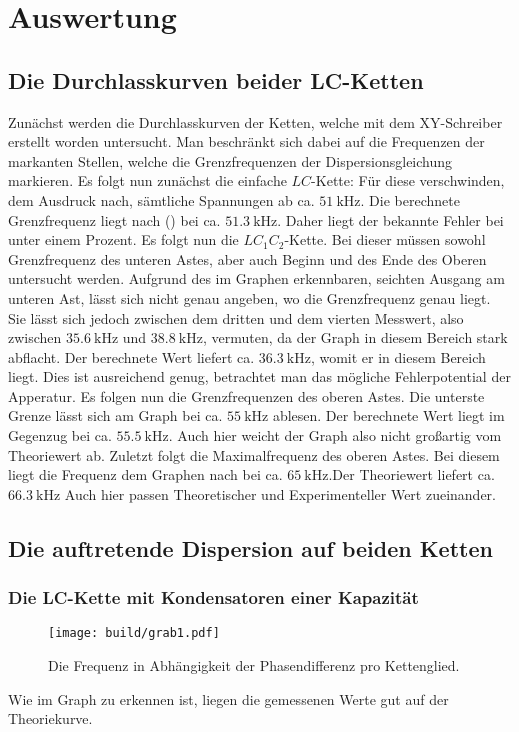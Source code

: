 
\section{Auswertung}
\label{sec:Auswertung}
\subsection{Die Durchlasskurven beider LC-Ketten}
Zunächst werden die Durchlasskurven der Ketten, welche mit dem XY-Schreiber
 erstellt worden untersucht. Man beschränkt sich dabei auf die Frequenzen der
  markanten Stellen, welche die Grenzfrequenzen der Dispersionsgleichung
	 markieren. Es folgt nun zunächst die einfache $LC$-Kette:
	 Für diese verschwinden, dem Ausdruck nach, sämtliche Spannungen ab ca.
	  $\SI{51}{\kilo\hertz}$. Die berechnete Grenzfrequenz liegt nach () bei
		 ca. $\SI{51,3}{\kilo\hertz}$. Daher liegt der bekannte Fehler bei
		  unter einem Prozent. Es folgt nun die $LC_1C_2$-Kette. Bei dieser müssen
			 sowohl Grenzfrequenz des unteren Astes, aber auch Beginn und des Ende des
			  Oberen untersucht werden. Aufgrund des im Graphen erkennbaren, seichten
				Ausgang am unteren Ast, lässt sich nicht genau angeben, wo die
				 Grenzfrequenz genau liegt. Sie lässt sich jedoch zwischen dem dritten
				  und dem vierten Messwert, also zwischen $\SI{35,6}{\kilo\hertz}$ und
					$\SI{38,8}{\kilo\hertz}$, vermuten, da der Graph in diesem Bereich
					 stark abflacht. Der berechnete Wert liefert ca. $\SI{36,3}{\kilo\hertz}$,
					  womit er in diesem Bereich liegt. Dies ist ausreichend genug,
						 betrachtet man das mögliche Fehlerpotential der Apperatur.
						 Es folgen nun die Grenzfrequenzen des oberen Astes. Die
						  unterste Grenze lässt sich am Graph bei ca. $\SI{55}{\kilo\hertz}$
							ablesen. Der berechnete Wert liegt im Gegenzug bei
							 ca. $\SI{55,5}{\kilo\hertz}$. Auch hier weicht der Graph also nicht
							 großartig vom Theoriewert ab. Zuletzt folgt die Maximalfrequenz
							 des oberen Astes. Bei diesem liegt die Frequenz dem Graphen nach bei ca.
							  $\SI{65}{\kilo\hertz}$.Der Theoriewert liefert ca. $\SI{66,3}{\kilo\hertz}$
								Auch hier passen Theoretischer und Experimenteller Wert zueinander.


\subsection{Die auftretende Dispersion auf beiden Ketten}
\subsubsection{Die LC-Kette mit Kondensatoren einer Kapazität}
\begin{figure}[H]
	\centering
	\caption{Die Frequenz in Abhängigkeit der Phasendifferenz pro Kettenglied.}
	\texttt{[image: build/grab1.pdf]}
	\label{fig:grab1}
\end{figure}

Wie im Graph zu erkennen ist, liegen die gemessenen Werte gut auf der Theoriekurve.

